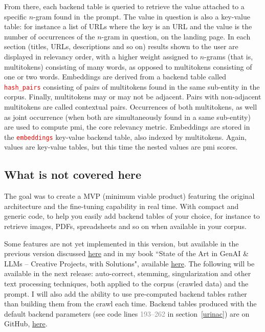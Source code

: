 \documentclass[10pt]{article}
\begin{document}
From there, each backend table is queried to retrieve the value attached to a specific $n$-gram found in~the prompt. The value in question is also a key-value table: for instance a list of URLs where the key is an URL and the value is the number of occurrences of the $n$-gram in question, on the landing page. In each section (titles, URLs, descriptions and so on) results shown to the user are displayed in relevancy order, with a higher weight assigned to $n$-grams (that is, multitokens) consisting of many words, as opposed to multitokens consisting of one or two words. Embeddings 
are derived from a backend table called \textcolor{red}{\texttt{hash\_pairs}} consisting of pairs of multitokens found in the same sub-entity in the corpus.
Finally, multitokens may or may not be adjacent. Pairs with non-adjacent multitokens are called \textcolor{index}{contextual pairs}. Occurrences of both multitokens, as well as joint occurrence (when both are simultaneously found in a same sub-entity) are used to compute \textcolor{index}{pmi}, the core relevancy metric. Embeddings are stored in the \textcolor{red}{\texttt{embeddings}} key-value backend table, also indexed by multitokens. Again, values are key-value tables, but this time the nested values are \textcolor{index}{pmi} scores.





\subsection{What is not covered here}

The goal was to create a MVP (minimum viable product) featuring the original architecture and the fine-tuning capability in real time. With compact and generic code, to help you easily add backend tables of your choice, for instance to retrieve images, PDFs, spreadsheets and so on when available in your corpus. 

Some features are not yet implemented in this version, but available in the previous version discussed \href{https://mltblog.com/3KqlNO7}{here}
 and in my book ``State of the Art in GenAI \& LLMs -- Creative Projects, with Solutions", available \href{https://mltechniques.com/product/ebook-state-of-the-art-in-genai-llms-creative-projects-with-solutions/}{here}. The following will be available in the next release: auto-correct, stemming, singularization and other text processing techniques, both applied to the corpus (crawled data) and the prompt. I will also add the ability to use
 pre-computed backend tables rather than building them from the crawl each time. Backend tables produced with the default backend parameters
 (see code lines \textcolor{gray}{193--262} in section~\ref{urinac})
 are on GitHub, \href{https://github.com/VincentGranville/Large-Language-Models/tree/main/xllm6/enterprise}{here}.  
\end{document}
